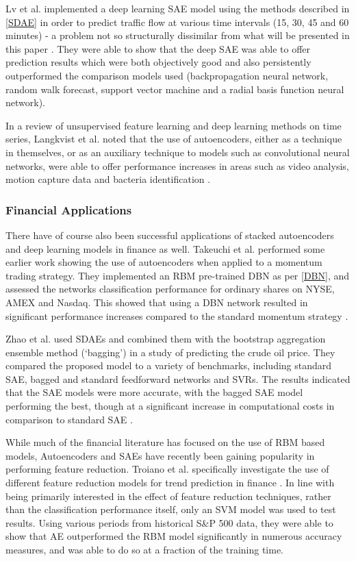 \documentclass[a4paper,11pt,oneside]{article}
\theoremstyle{plain}
\theoremstyle{definition}
\begin{document}
Lv et al.  implemented a deep learning SAE model using the methods described in \ref{SDAE} in order to 
predict traffic flow at various time intervals (15, 30, 45 and 60 minutes) - a problem not so structurally dissimilar 
from what will be presented in this paper \cite{Lv}. They were able to show that the deep SAE was able to offer prediction 
results which were both objectively good and also persistently outperformed the comparison models used 
(backpropagation neural network, random walk forecast, support vector machine and a radial basis function 
neural network).
\hfill \break 

In a review of unsupervised feature learning and deep learning methods on time series, Langkvist et al. noted that 
the use of autoencoders, either as a technique in themselves, or as an auxiliary technique to models 
such as convolutional neural networks, were able to offer performance increases in areas such as video analysis, 
motion capture data and bacteria identification \cite{Langkvist}.
 
\subsubsection{Financial Applications}

There have of course also been successful applications of stacked autoencoders and deep learning models in 
finance as well. Takeuchi et al. performed some earlier work showing the use of autoencoders when applied to a 
momentum trading strategy. They implemented an RBM pre-trained DBN as per \ref{DBN}, and assessed the 
networks classification performance for ordinary shares on NYSE, AMEX and Nasdaq. This showed that using a 
DBN network resulted in significant performance increases compared to the standard momentum strategy \cite{Takeuchi}.
\hfill \break 

Zhao et al. used SDAEs and combined them with the bootstrap aggregation ensemble method (‘bagging’) in a 
study of predicting the crude oil price. They compared the proposed model to a variety of benchmarks, including 
standard SAE, bagged and standard feedforward networks and SVRs. The results indicated that the SAE models 
were more accurate, with the bagged SAE model performing the best, though at a significant increase in 
computational costs in comparison to standard SAE \cite{Zhao}.
\hfill \break 

While much of the financial literature has focused on the use of RBM based models, Autoencoders and SAEs have 
recently been gaining popularity in performing feature reduction. Troiano et al. specifically investigate the use of 
different feature reduction models for trend prediction in finance \cite{Troiano}. In line with being primarily 
interested in the effect of feature reduction techniques, rather than the classification performance itself, only an 
SVM model was used to test results. Using various periods from historical S\&P 500 data, they were able to show 
that AE outperformed the RBM model significantly in numerous accuracy measures, and was able to do so at a 
fraction of the training time.
\hfill \break 
\end{document}
